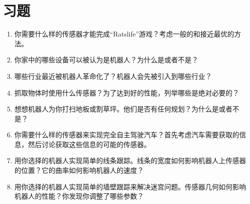 
\section*{习题}\small
\begin{enumerate}
\item 你需要什么样的传感器才能完成“Ratslife”游戏？考虑一般的和接近最优的方法。
\item 你家中的哪些设备可以被认为是机器人？为什么是或者不是？
\item 哪些行业最近被机器人革命化了？机器人会先被引入到哪些行业？
\item 抓取物体时使用什么传感器？为了达到好的性能，列举哪些是绝对必要的？
\item 想想机器人为你打扫地板或割草坪。他们是否有任何规划？为什么是或者不是？
\item 你需要什么样的传感器来实现完全自主驾驶汽车？首先考虑汽车需要获取的信息，然后讨论获取这些信息的可能的传感器。
\item 用你选择的机器人实现简单的线条跟踪。线条的宽度如何影响机器人上传感器的位置？它的曲率如何影响机器人的速度？
\item 用你选择的机器人实现简单的墙壁跟踪来解决迷宫问题。传感器几何如何影响机器人的性能？你发现你调整了哪些参数？
\end{enumerate}\normalsize


